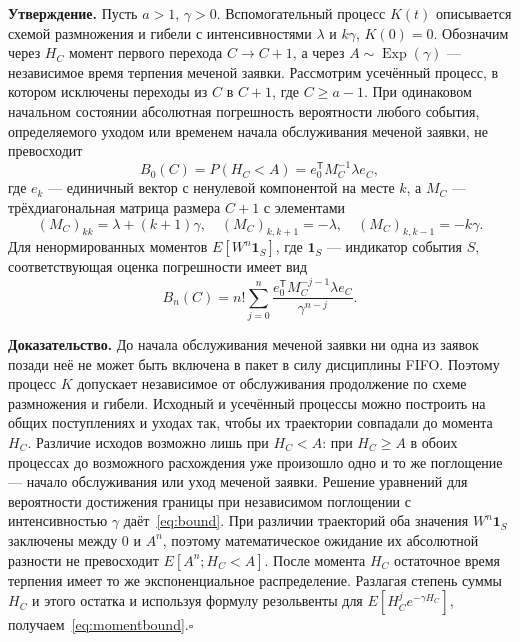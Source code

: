 \noindent\textbf{Утверждение.}
Пусть $a>1$, $\gamma>0$. Вспомогательный процесс $K(t)$ описывается схемой размножения и гибели с интенсивностями $\lambda$ и $k\gamma$, $K(0)=0$. Обозначим через $H_C$ момент первого перехода $C\to C+1$, а через $A\sim\operatorname{Exp}(\gamma)$ --- независимое время терпения меченой заявки. Рассмотрим усечённый процесс, в котором исключены переходы из $C$ в $C+1$, где $C\geq a-1$. При одинаковом начальном состоянии абсолютная погрешность вероятности любого события, определяемого уходом или временем начала обслуживания меченой заявки, не превосходит
\begin{equation}\label{eq:bound}
 B_0(C)=P(H_C<A)=e_0^{\mathsf T}M_C^{-1}\lambda e_C,
\end{equation}
где $e_k$ --- единичный вектор с ненулевой компонентой на месте $k$, а $M_C$ --- трёхдиагональная матрица размера $C+1$ с элементами
\begin{equation}
 (M_C)_{kk}=\lambda+(k+1)\gamma,\quad
 (M_C)_{k,k+1}=-\lambda,\quad (M_C)_{k,k-1}=-k\gamma.
\end{equation}
Для ненормированных моментов $E[W^n\mathbf1_S]$, где $\mathbf1_S$ --- индикатор события $S$, соответствующая оценка погрешности имеет вид
\begin{equation}\label{eq:momentbound}
 B_n(C)=n!\sum_{j=0}^{n}
 \frac{e_0^{\mathsf T}M_C^{-j-1}\lambda e_C}{\gamma^{n-j}}.
\end{equation}

\noindent\textbf{Доказательство.}
До начала обслуживания меченой заявки ни одна из заявок позади неё не может быть включена в пакет в силу дисциплины FIFO. Поэтому процесс $K$ допускает независимое от обслуживания продолжение по схеме размножения и гибели. Исходный и усечённый процессы можно построить на общих поступлениях и уходах так, чтобы их траектории совпадали до момента $H_C$. Различие исходов возможно лишь при $H_C<A$: при $H_C\geq A$ в обоих процессах до возможного расхождения уже произошло одно и то же поглощение --- начало обслуживания или уход меченой заявки. Решение уравнений для вероятности достижения границы при независимом поглощении с интенсивностью $\gamma$ даёт~\eqref{eq:bound}. При различии траекторий оба значения $W^n\mathbf1_S$ заключены между $0$ и $A^n$, поэтому математическое ожидание их абсолютной разности не превосходит $E[A^n;H_C<A]$. После момента $H_C$ остаточное время терпения имеет то же экспоненциальное распределение. Разлагая степень суммы $H_C$ и этого остатка и используя формулу резольвенты для $E[H_C^j e^{-\gamma H_C}]$, получаем~\eqref{eq:momentbound}.\hfill$\square$


